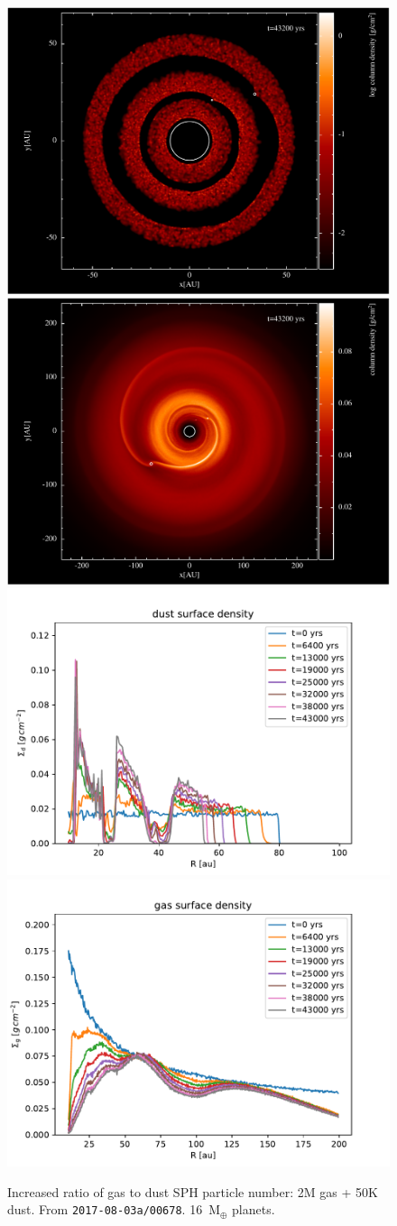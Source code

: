 \documentclass[usenatbib,a4paper,times,fleqn]{mnras}
\begin{document}
\begin{figure}
   \begin{center}
      \includegraphics[width=0.48\columnwidth]{figs/sph-dust-gas-particle-ratio-dust.pdf}
      \includegraphics[width=0.48\columnwidth]{figs/sph-dust-gas-particle-ratio-gas.pdf}
      \includegraphics[width=0.48\columnwidth]{figs/sph-dust-gas-particle-ratio-dust-sigma.pdf}
      \includegraphics[width=0.48\columnwidth]{figs/sph-dust-gas-particle-ratio-gas-sigma.pdf}
      \caption{Increased ratio of gas to dust SPH particle number: 2M gas + 50K
      dust. From \texttt{2017-08-03a/00678}. 16~M${}_{\oplus}$ planets.}
      \label{fig:sph-dust-gas-particle-ratio}
   \end{center}
\end{figure}
\end{document}

